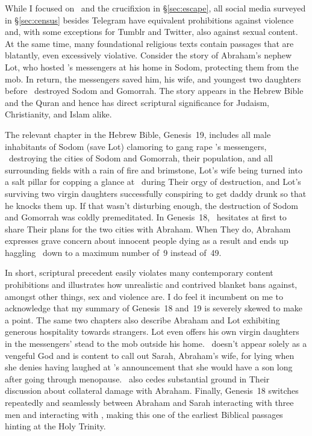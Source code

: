While I focused on \DALLE\ and the crucifixion in \S\ref{sec:escape}, all social
media surveyed in \S\ref{sec:census} besides Telegram have equivalent
prohibitions against violence and, with some exceptions for Tumblr and Twitter,
also against sexual content. At the same time, many foundational religious texts
contain passages that are blatantly, even excessively violative. Consider the
story of Abraham's nephew Lot, who hosted \YHWH's messengers at his home in
Sodom, protecting them from the mob. In return, the messengers saved him, his
wife, and youngest two daughters before \YHWH\ destroyed Sodom and Gomorrah. The
story appears in the Hebrew Bible and the Quran and hence has direct scriptural
significance for Judaism, Christianity, and Islam alike.

The relevant chapter in the Hebrew Bible, Genesis~19, includes all male
inhabitants of Sodom (save Lot) clamoring to gang rape \YHWH's messengers,
\YHWH\ destroying the cities of Sodom and Gomorrah, their population, and all
surrounding fields with a rain of fire and brimstone, Lot's wife being turned
into a salt pillar for copping a glance at \YHWH\ during Their orgy of
destruction, and Lot's surviving two virgin daughters successfully conspiring to
get daddy drunk so that he knocks them up. If that wasn't disturbing enough, the
destruction of Sodom and Gomorrah was coldly premeditated. In Genesis~18, \YHWH\
hesitates at first to share Their plans for the two cities with Abraham. When
They do, Abraham expresses grave concern about innocent people dying as a result
and ends up haggling \YHWH\ down to a maximum number of~9 instead of~49.

In short, scriptural precedent easily violates many contemporary content
prohibitions and illustrates how unrealistic and contrived blanket bans against,
amongst other things, sex and violence are. I do feel it incumbent on me to
acknowledge that my summary of Genesis~18 and~19 is severely skewed to make a
point. The same two chapters also describe Abraham and Lot exhibiting generous
hospitality towards strangers. Lot even offers his own virgin daughters in the
messengers' stead to the mob outside his home. \YHWH\ doesn't appear solely as a
vengeful God and is content to call out Sarah, Abraham's wife, for lying when
she denies having laughed at \YHWH's announcement that she would have a son long
after going through menopause. \YHWH\ also cedes substantial ground in Their
discussion about collateral damage with Abraham. Finally, Genesis~18 switches
repeatedly and seamlessly between Abraham and Sarah interacting with three men
and interacting with \YHWH, making this one of the earliest Biblical passages
hinting at the Holy Trinity.


